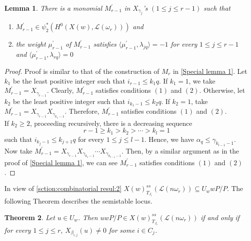 \documentclass[12pt,reqno]{amsart}
\numberwithin{equation}{section}
\newtheorem{theorem}{Theorem}[section]
\newtheorem{lemma}[theorem]{Lemma}
\theoremstyle{definition}
\begin{document}
\begin{lemma}\label{Special lemma 2} There is a monomial $M^{\prime}_{r-1}$ in $X_{\gamma_{j}}$'s $(1\leq j\leq r-1)$ such that 
	\begin{enumerate}
		\item $M^{\prime}_{r-1}\in \psi_{2}^{*}(H^{0}(X(w),\mathcal{L}(\omega_{r})))$ and
		\item the weight $\mu^{\prime}_{r-1}$ of $M^{\prime}_{r-1}$ satisfies $\langle\mu^{\prime}_{r-1},\lambda_{jq}\rangle=-1$ for every $1\leq j\leq r-1$ and $\langle\mu^{\prime}_{r-1},\lambda_{rq}\rangle=0$
	\end{enumerate}
\end{lemma}
\begin{proof}
Proof is similar to that of the construction of $M_{r}$ in \cref{Special lemma 1}. Let $k_{1}$ be the least positive integer such that $i_{r-1}\leq k_{1}q$. If $k_{1}=1$, we take $M^{\prime}_{r-1}=X_{\gamma_{r-1}}$. Clearly, $M^{\prime}_{r-1}$ satisfies conditions $(1)$ and $(2)$. Otherwise, let $k_{2}$ be the least positive integer such that $i_{k_{1}-1}\leq k_{2}q$. If $k_{2}=1$, take $M^{\prime}_{r-1}=X_{\gamma_{r-1}}X_{\gamma_{k_{1}-1}}$. Therefore, $M^{\prime}_{r-1}$ satisfies conditions $(1)$ and $(2)$.\\
If $k_{2}\geq 2$, proceeding recursively, there is a decreasing sequence
$$ r-1\geq k_{1}>k_{2}>\cdots>k_{l}=1$$
such that $i_{k_{j}-1}\leq k_{j+1}q$ for every $1\leq j\leq l-1$. Hence, we have $\alpha_{q}\leq \gamma_{k_{l-1}-1}$. \\
Now take $M^{\prime}_{r-1}=X_{\gamma_{r-1}}X_{\gamma_{k_{1}-1}}\cdots X_{\gamma_{k_{l-1}-1}}$. Then, by a similar argument as in the proof of \cref{Special lemma 1}, we can see $M^{\prime}_{r-1}$ satisfies conditions $(1)$ and $(2)$.
\end{proof}
In view of  \cref{sction:combinatorial resul:2} $X(w)^{ss}_{T_{J_{r}}}(\mathcal{L}(n\omega_{r}))\subseteq U_{w}wP/P$. The following Theorem describes the semistable locus.
\begin{theorem}\label{semistability criterion}
		Let $u\in U_{w}$. Then $uwP/P\in X(w)^{ss}_{T_{J_{r}}}(\mathcal{L}(n\omega_{r}))$ if and only if for every $1\leq j\leq r$, $X_{\beta_{i,j}}(u)\neq 0$ for some $i\in C_{j}$.
\end{theorem}
\end{document}
